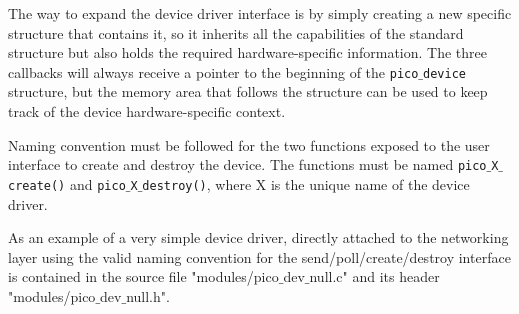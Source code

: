 The way to expand the device driver interface is by simply creating a new specific structure
that contains it, so it inherits all the capabilities of the standard structure but also holds
the required hardware-specific information. The three callbacks will always receive a pointer
to the beginning of the \texttt{pico$\_$device} structure, but the memory area that follows
the structure can be used to keep track of the device hardware-specific context.

Naming convention must be followed for the two functions exposed to the user interface to
create and destroy the device. The functions must be named \texttt{pico$\_$X$\_$create()} and
\texttt{pico$\_$X$\_$destroy()}, where X is the unique name of the device driver.

As an example of a very simple device driver, directly attached to the networking layer using
the valid naming convention for the send/poll/create/destroy interface is contained in the source
file "modules/pico$\_$dev$\_$null.c" and its header "modules/pico$\_$dev$\_$null.h".